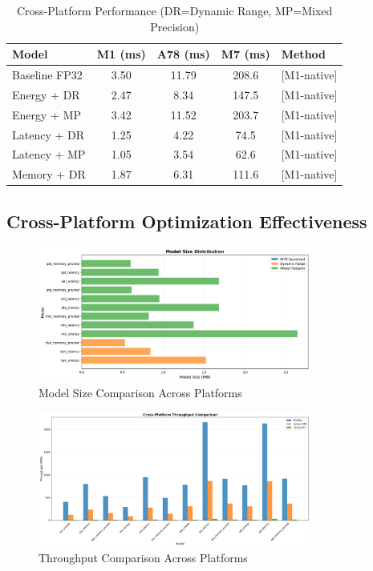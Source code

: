 \documentclass[10pt, a4paper]{article}
\begin{document}
\begin{table}[H]
\centering
\scriptsize
\begin{tabular}{|l|c|c|c|l|}
\hline
\textbf{Model} & \textbf{M1 (ms)} & \textbf{A78 (ms)} & \textbf{M7 (ms)} & \textbf{Method} \\
\hline
Baseline FP32 & 3.50 & 11.79 & 208.6 & [M1-native] \\
Energy + DR & 2.47 & 8.34 & 147.5 & [M1-native] \\
Energy + MP & 3.42 & 11.52 & 203.7 & [M1-native] \\
Latency + DR & 1.25 & 4.22 & 74.5 & [M1-native] \\
Latency + MP & 1.05 & 3.54 & 62.6 & [M1-native] \\
Memory + DR & 1.87 & 6.31 & 111.6 & [M1-native] \\
\hline
\end{tabular}
\caption{Cross-Platform Performance (DR=Dynamic Range, MP=Mixed Precision)}
\end{table}

\subsection{Cross-Platform Optimization Effectiveness}
\begin{figure}[H]
\centering
\includegraphics[width=0.8\textwidth]{charts/part3_model_sizes.png}
\caption{Model Size Comparison Across Platforms}
\end{figure}

\begin{figure}[H]
\centering
\includegraphics[width=0.8\textwidth]{charts/part3_throughput_comparison.png}
\caption{Throughput Comparison Across Platforms}
\end{figure}
\end{document}
